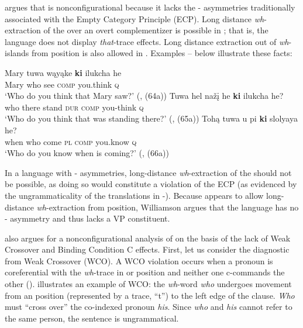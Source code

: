 \documentclass[output=paper]{LSP/langsci}
\begin{document}
\citet{Williamson1984} argues that  is nonconfigurational because it lacks the - asymmetries traditionally associated with the Empty Category Principle (ECP).  Long distance \textit{wh}-extraction of the  over an overt complementizer is possible in ; that is, the language does not display \textit{that}-trace effects. Long distance extraction out of \textit{wh}-islands from  position is also allowed in .  Examples -- below illustrate these facts:

\begin{exe}
\ex\label{ex:jrs:6} \gll Mary		tuwa		wąyąke	\textbf{ki}			ilukcha 		he \\
Mary 	who		see 			\textsc{comp}		you.think	\textsc{q} \\
\trans `Who do you think that Mary saw?' (\citealt[281]{Williamson1984}, (64a))
\ex\label{ex:jrs:7} \gll Tuwa		hel			na\v{z}\k{i} 		he		\textbf{ki}			ilukcha 		he? \\
who		there		stand		\textsc{dur} 	\textsc{comp}		you-think	\textsc{q} \\
\trans `Who do you think that was standing there?' (\citealt[281]{Williamson1984}, (65a))
\ex\label{ex:jrs:8} \gll	Tohą		tuwa	u				pi	\textbf{ki} 			slolyaya		he? \\
when		who	come		\textsc{pl} 	\textsc{comp} 	you.know \textsc{q} \\
\trans `Who do you know when is coming?' (\citealt[281]{Williamson1984}, (66a))
\end{exe} 

In a language with - asymmetries, long-distance \textit{wh}-extraction of the  should not be possible, as doing so would constitute a violation of the ECP (as evidenced by the ungrammaticality of the  translations in -).  Because  appears to allow long-distance \textit{wh}-extraction from  position, Williamson argues that the language has no - asymmetry and thus lacks a VP constituent.

\citet{VanValin1985,VanValin1987} also argues for a nonconfigurational analysis of  on the basis of the lack of Weak Crossover and Binding Condition C effects.  First, let us consider the diagnostic from Weak Crossover (WCO). A WCO violation occurs when a pronoun is coreferential with the \textit{wh}-trace in  or  position and neither one c-commands the other (\citealt{Sportiche1985}).   illustrates an  example of WCO: the \textit{wh}-word \textit{who} undergoes movement from an  position (represented by a trace, ``t'') to the left edge of the clause. \textit{Who} must ``cross over'' the co-indexed pronoun \textit{his}. Since \textit{who} and \textit{his} cannot refer to the same person, the sentence is ungrammatical. 
\end{document}
